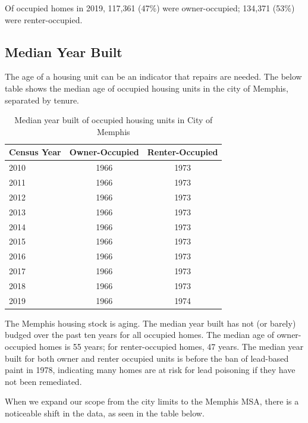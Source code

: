 \documentclass[
  openany]{book}
\begin{document}
Of occupied homes in 2019, 117,361 (47\%) were owner-occupied; 134,371 (53\%) were renter-occupied.

\hypertarget{median-year-built}{%
\subsection{Median Year Built}\label{median-year-built}}

The age of a housing unit can be an indicator that repairs are needed. The below table shows the median age of occupied housing units in the city of Memphis, separated by tenure.

\begin{table}

\caption{\label{tab:tblmedyrbltmem}Median year built of occupied housing units in City of Memphis}
\centering
\begin{tabular}[t]{l|c|c}
\hline
Census Year & Owner-Occupied & Renter-Occupied\\
\hline
2010 & 1966 & 1973\\
\hline
2011 & 1966 & 1973\\
\hline
2012 & 1966 & 1973\\
\hline
2013 & 1966 & 1973\\
\hline
2014 & 1966 & 1973\\
\hline
2015 & 1966 & 1973\\
\hline
2016 & 1966 & 1973\\
\hline
2017 & 1966 & 1973\\
\hline
2018 & 1966 & 1973\\
\hline
2019 & 1966 & 1974\\
\hline
\end{tabular}
\end{table}

The Memphis housing stock is aging. The median year built has not (or barely) budged over the past ten years for all occupied homes. The median age of owner-occupied homes is 55 years; for renter-occupied homes, 47 years. The median year built for both owner and renter occupied units is before the ban of lead-based paint in 1978, indicating many homes are at risk for lead poisoning if they have not been remediated.

When we expand our scope from the city limits to the Memphis MSA, there is a noticeable shift in the data, as seen in the table below.
\end{document}
